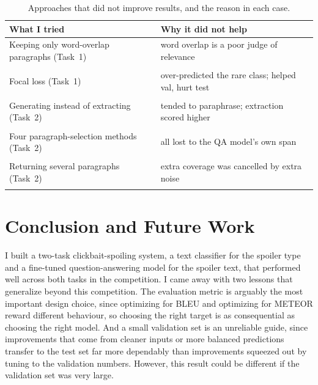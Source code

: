 \documentclass[11pt]{article}
\begin{document}
\begin{table}[t]
\centering\small
\begin{tabular}{@{}p{3.3cm}p{3.7cm}@{}}
\toprule
What I tried & Why it did not help \\
\midrule

Keeping only word-overlap paragraphs (Task~1) & word overlap is a poor judge of relevance \\\\

Focal loss (Task~1) & over-predicted the rare class; helped val, hurt test \\\\

Generating instead of extracting (Task~2) & tended to paraphrase; extraction scored higher \\\\

Four paragraph-selection methods (Task~2) & all lost to the QA model's own span \\\\

Returning several paragraphs (Task~2) & extra coverage was cancelled by extra noise \\\\

\bottomrule
\end{tabular}
\caption{Approaches that did not improve results, and the reason in each case.}
\label{tab:negative}
\end{table}

\section{Conclusion and Future Work}
\label{sec:conclusion}
I built a two-task clickbait-spoiling system, a text classifier for the spoiler
type and a fine-tuned question-answering model for the spoiler text, that performed well across both tasks in the competition. I came away with two lessons that generalize beyond this competition. The evaluation metric is
arguably the most important design choice, since optimizing for BLEU and optimizing for METEOR reward
different behaviour, so choosing the right target is as consequential as choosing
the right model. And a small validation set is an unreliable guide, since improvements
that come from cleaner inputs or more balanced predictions transfer to the test
set far more dependably than improvements squeezed out by tuning to the validation
numbers. However, this result could be different if the validation set was very large.
\end{document}

